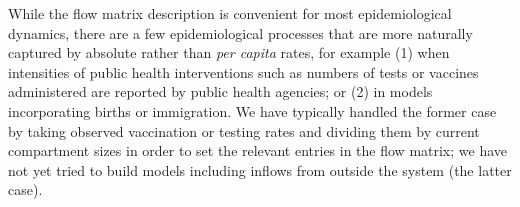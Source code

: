 \documentclass[12pt]{article}\usepackage[]{graphicx}\usepackage[]{color}
\begin{document}
While the flow matrix description is convenient for most epidemiological dynamics, there are a few epidemiological processes that are more naturally captured by absolute rather than \emph{per capita} rates, for example (1) when intensities of public health interventions such as numbers of tests or vaccines administered are reported by public health agencies; or (2) in models incorporating births or immigration.
We have typically handled the former case by taking observed vaccination or testing rates and dividing them by current compartment sizes in order to set the relevant entries in the flow matrix; we have not yet tried to build models including inflows from outside the system (the latter case).
\end{document}
